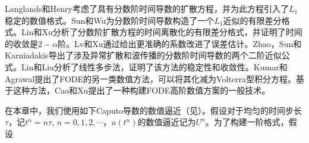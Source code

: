 Langlands和Henry考虑了具有分数阶时间导数的扩散方程，并为此方程引入了$ L_1 $稳定的数值格式。Sun和Wu为分数阶时间导数构造了一个$L_1$近似的有限差分格式。Lin和Xu分析了分数阶扩散方程的时间离散化的有限差分格式，并证明了时间的收敛是$2-\alpha$阶。Lv和Xu通过给出更准确的系数改进了误差估计。Zhao，Sun和Karniadakis导出了涉及异常扩散和波传播的分数阶时间导数的两个二阶近似公式。Lin和Liu分析了线性多步法，证明了该方法的稳定性和收敛性。Kumar和Agrawal提出了FODE的另一类数值方法，可以将其化减为Volterra型积分方程。基于这种方法，Cao和Xu提出了一种构建FODE高阶数值方案的一般技术。

在本章中，我们使用如下Caputo导数的数值逼近（见）。假设对于均匀的时间步长$\tau$，记$t^n=n\tau$, $n=0,1,2,\cdots$，$u(t^n)$的数值逼近记为$U^n$。为了构建一阶格式，假设

